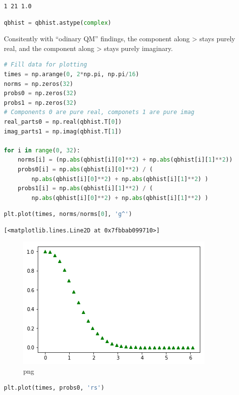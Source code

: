 \begin{lstlisting}
1 21 1.0
\end{lstlisting}

\begin{lstlisting}[language=Python]
qbhist = qbhist.astype(complex)
\end{lstlisting}

Consitently with ``odinary QM'' findings, the component along
\textgreater{} stays purely real, and the component along
\textgreater{} stays purely imaginary.

\begin{lstlisting}[language=Python]
# Fill data for plotting
times = np.arange(0, 2*np.pi, np.pi/16)
norms = np.zeros(32)
probs0 = np.zeros(32)
probs1 = np.zeros(32)
# Components 0 are pure real, componets 1 are pure imag
real_parts0 = np.real(qbhist.T[0])
imag_parts1 = np.imag(qbhist.T[1])

for i in range(0, 32):
    norms[i] = (np.abs(qbhist[i][0]**2) + np.abs(qbhist[i][1]**2))
    probs0[i] = np.abs(qbhist[i][0]**2) / (
        np.abs(qbhist[i][0]**2) + np.abs(qbhist[i][1]**2) )
    probs1[i] = np.abs(qbhist[i][1]**2) / (
        np.abs(qbhist[i][0]**2) + np.abs(qbhist[i][1]**2) )
\end{lstlisting}

\begin{lstlisting}[language=Python]
plt.plot(times, norms/norms[0], 'g^')
\end{lstlisting}

\begin{lstlisting}
[<matplotlib.lines.Line2D at 0x7fbbab099710>]
\end{lstlisting}

\begin{figure}
\centering
\includegraphics[width=0.66\linewidth]{output_82_1.png}
\caption{png}
\end{figure}

\begin{lstlisting}[language=Python]
plt.plot(times, probs0, 'rs')
\end{lstlisting}

